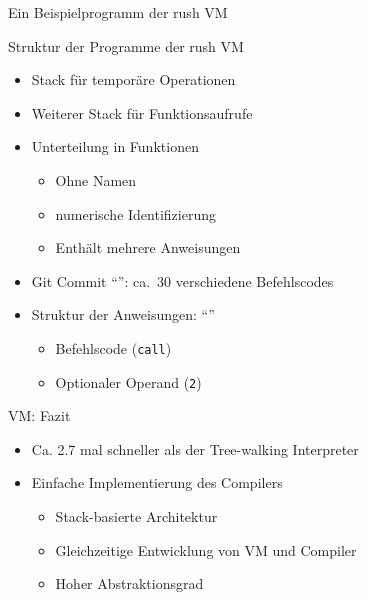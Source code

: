 \begin{frame}{Ein Beispielprogramm der rush VM }
	\hspace{0pt} %
	\vfill
	\vfill
\end{frame}

\begin{frame}{Struktur der Programme der rush VM}
	\begin{itemize}
		\item Stack für temporäre Operationen
		\item Weiterer Stack für Funktionsaufrufe
		\item Unterteilung in Funktionen
		      \begin{itemize}
			      \item Ohne Namen
			      \item numerische Identifizierung
			      \item Enthält mehrere Anweisungen
		      \end{itemize}
		\item Git Commit \enquote{\rushCommit{}}: ca.\ 30 verschiedene Befehlscodes
		\item Struktur der Anweisungen: \enquote{}
		      \begin{itemize}
			      \item Befehlscode (\texttt{call})
			      \item Optionaler Operand (\texttt{2})
		      \end{itemize}
	\end{itemize}
\end{frame}

\begin{frame}{VM: Fazit}
	\begin{itemize}
		\item Ca. 2.7 mal schneller als der Tree-walking Interpreter
		\item Einfache Implementierung des Compilers
		      \begin{itemize}
			      \item  Stack-basierte Architektur
			      \item Gleichzeitige Entwicklung von VM und Compiler
			      \item Hoher Abstraktionsgrad
		      \end{itemize}
	\end{itemize}
\end{frame}

